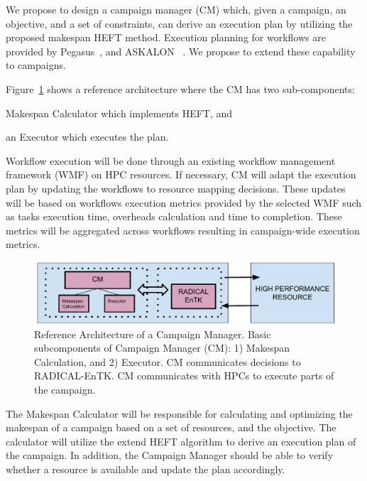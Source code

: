 We propose to design a campaign manager (CM) which, given a campaign, an objective, and a set of constraints, can derive an execution plan by utilizing the proposed makespan HEFT method.
Execution planning for workflows are provided by Pegasus~\cite{deelman2015pegasus}, and ASKALON~\cite{fahringer2005askalon} .
We propose to extend these capability to campaigns.

Figure~\ref{fig:refarch} shows a reference architecture where the CM has two sub-components:
\begin{inparaenum}[(1)]
\item Makespan Calculator which implements HEFT, and
\item an Executor which executes the plan. 
\end{inparaenum}
Workflow execution will be done through an existing workflow management framework (WMF) on HPC resources.
If necessary, CM will adapt the execution plan by updating the workflows to resource mapping decisions. 
These updates will be based on workflows execution metrics provided by the selected WMF such as tasks execution time, overheads calculation and time to completion.
These metrics will be aggregated across workflows resulting in campaign-wide execution metrics.

\begin{figure}[t]
    \centering
    \includegraphics[width=.95\textwidth]{figures/CEM_RefArch.pdf}
    \caption{Reference Architecture of a Campaign Manager. Basic 
    subcomponents of Campaign Manager (CM): 1) Makespan Calculation, and 2) Executor. 
    CM communicates decisions to RADICAL-EnTK. CM communicates with HPCs to 
    execute parts of the campaign.}\label{fig:refarch}
\end{figure}

The Makespan Calculator will be responsible for calculating and optimizing  the makespan of a campaign based on a set of resources, and the objective.
The calculator will utilize the extend HEFT algorithm to derive an execution plan of the campaign. 
In addition, the Campaign Manager  should be able to verify whether a resource is available and update the plan accordingly.

